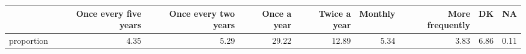 \begin{table}[ht]
\centering
\begin{tabular}{rrrrrrrrr}
  \hline
 & Once every five years & Once every two years & Once a year & Twice a year & Monthly & More frequently & DK & NA \\ 
  \hline
proportion & 4.35 & 5.29 & 29.22 & 12.89 & 5.34 & 3.83 & 6.86 & 0.11 \\ 
   \hline
\end{tabular}
\end{table}
